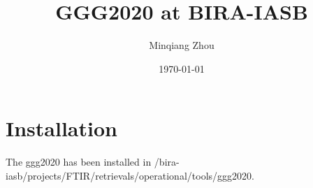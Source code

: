 \documentclass{article}
\title{GGG2020 at BIRA-IASB} %
\author{Minqiang Zhou} %
\date{\today} %
\begin{document}
\maketitle %




\section{Installation}
The ggg2020 has been installed in /bira-iasb/projects/FTIR/retrievals/operational/tools/ggg2020.
\end{document}
